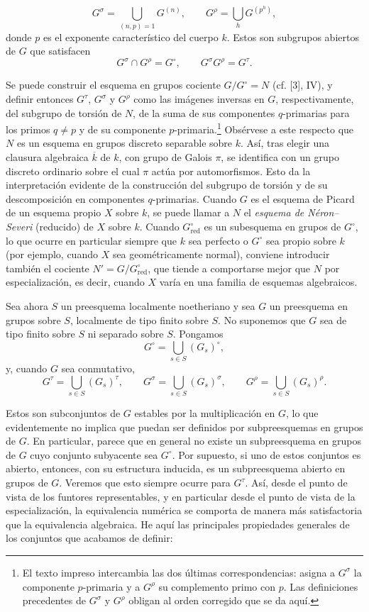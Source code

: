 \[
G^\sigma=\bigcup_{(n,p)=1}G^{(n)},
\qquad
G^\rho=\bigcup_hG^{(p^h)},
\]
donde $p$ es el exponente característico del cuerpo $k$. Estos son subgrupos
abiertos de $G$ que satisfacen
\[
G^\sigma\cap G^\rho=G^\circ,
\qquad
G^\sigma G^\rho=G^\tau.
\]

 Se puede construir el esquema en grupos cociente
$G/G^\circ=N$ (cf. [3], IV), y definir entonces $G^\tau$, $G^\sigma$ y
$G^\rho$ como las imágenes inversas en $G$, respectivamente, del subgrupo de
torsión de $N$, de la suma de sus componentes $q$-primarias para los primos
$q\neq p$ y de su componente $p$-primaria.\footnote{El texto impreso intercambia
las dos últimas correspondencias: asigna a $G^\sigma$ la componente
$p$-primaria y a $G^\rho$ su complemento primo con $p$. Las definiciones
precedentes de $G^\sigma$ y $G^\rho$ obligan al orden corregido que se da aquí.}
Obsérvese a este respecto que $N$ es un esquema en
grupos discreto separable sobre $k$. Así, tras elegir una clausura algebraica
$\overline k$ de $k$, con grupo de Galois $\pi$, se identifica con un grupo
discreto ordinario sobre el cual $\pi$ actúa por automorfismos. Esto da la
interpretación evidente de la construcción del subgrupo de torsión y de su
descomposición en componentes $q$-primarias. Cuando $G$ es el esquema de
Picard de un esquema propio $X$ sobre $k$, se puede llamar a $N$ el
\emph{esquema de Néron--Severi} (reducido) de $X$ sobre $k$. Cuando
$G^\circ_{\mathrm{red}}$ es un subesquema en grupos de $G^\circ$, lo que ocurre
en particular siempre que $k$ sea perfecto o $G^\circ$ sea propio sobre $k$
(por ejemplo, cuando $X$ sea geométricamente normal), conviene introducir
también el cociente $N'=G/G^\circ_{\mathrm{red}}$, que tiende a comportarse
mejor que $N$ por especialización, es decir, cuando $X$ varía en una familia
de esquemas algebraicos.

Sea ahora $S$ un preesquema localmente noetheriano y sea $G$ un preesquema en
grupos sobre $S$, localmente de tipo finito sobre $S$. No suponemos que $G$ sea
de tipo finito sobre $S$ ni separado sobre $S$. Pongamos
\[
G^\circ=\bigcup_{s\in S}(G_s)^\circ,
\]
y, cuando $G$ sea conmutativo,
\[
G^\tau=\bigcup_{s\in S}(G_s)^\tau,
\qquad
G^\sigma=\bigcup_{s\in S}(G_s)^\sigma,
\qquad
G^\rho=\bigcup_{s\in S}(G_s)^\rho.
\]

Estos son subconjuntos de $G$ estables por la multiplicación en $G$, lo que
evidentemente no implica que puedan ser definidos por subpreesquemas en grupos
de $G$. En particular, parece que en general no existe un subpreesquema en
grupos de $G$ cuyo conjunto subyacente sea $G^\circ$. Por supuesto, si uno de
estos conjuntos es abierto, entonces, con su estructura inducida, es un
subpreesquema abierto en grupos de $G$. Veremos que esto siempre ocurre para
$G^\tau$. Así, desde el punto de vista de los funtores representables, y en
particular desde el punto de vista de la especialización, la equivalencia
numérica se comporta de manera más satisfactoria que la equivalencia
algebraica. He aquí las principales propiedades generales de los conjuntos que
acabamos de definir:

